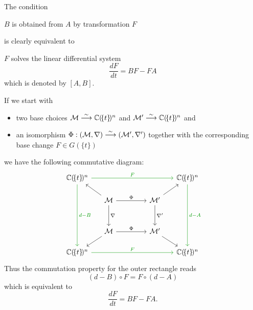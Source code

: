 \begin{rem}
  The condition
  \begin{einr}
    $B$ is obtained from $A$ by transformation $F$
  \end{einr}
  is clearly equivalent to
  \begin{einr}
    $F$ solves the linear differential system
    \[
      \frac{dF}{dt}=BF-FA
    \]
    which is denoted by $[A,B]$.
  \end{einr}
  \begin{s-rem}
    If we start with
    \begin{itemize}
      \item two base choices $\mathcal{M}\overset{\sim}\longrightarrow\mathbb{C}(\!\{t\}\!)^n$
        and $\mathcal{M}'\overset{\sim}\longrightarrow\mathbb{C}(\!\{t\}\!)^n$ and
      \item an isomorphism
        $\Phi:(\mathcal{M},\nabla)\overset{\sim}\longrightarrow(\mathcal{M}',\nabla')$ together
        with the corresponding base change $F\in G(\!\{t\}\!)$
    \end{itemize}
    we have the following commutative diagram:
    \[ \begin{tikzcd}[column sep=.5cm,row sep=.5cm]
        \C(\!\{t\}\!)^n
        \arrow[green!60!black]{rrrrr}{F}\arrow[green!60!black]{dddd}{d-B}&&&&&
          \C(\!\{t\}\!)^n\arrow[green!60!black]{dddd}{d-A}
          \\ & \cM \arrow{dd}{\nabla}\arrow{rrr}{\Phi}\ular&&&
          \cM'\arrow{dd}{\nabla'}\urar
          \\
        \\ & \cM \arrow{rrr}{\Phi}\dlar&&& \cM'\drar
        \\ \C(\!\{t\}\!)^n \arrow[green!60!black]{rrrrr}{F}&&&&&
          \C(\!\{t\}\!)^n
    \end{tikzcd} \]
    Thus the commutation property for the outer rectangle reads
    \[
      (d-B)\circ F=F\circ(d-A)
    \]
    which is equivalent to
    \[
      \frac{dF}{dt}=BF-FA.
    \]
  \end{s-rem}
\end{rem}
